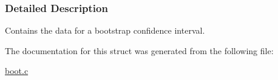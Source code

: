 \subsubsection{\-Detailed \-Description}
\-Contains the data for a bootstrap confidence interval. 



\-The documentation for this struct was generated from the following file\-:\begin{DoxyCompactItemize}
\item 
\hyperlink{boot_8c}{boot.\-c}\end{DoxyCompactItemize}
